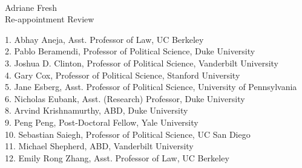 \documentclass[11pt]{article}
\begin{document}
\singlespacing
\setlength{\parindent}{0in}
\setlength{\parskip}{0in}







\noindent \large{\textbf{}} \\ \normalsize
\noindent Adriane Fresh \\
\noindent Re-appointment Review  \\

\vspace*{.2in}

1. Abhay Aneja, Asst. Professor of Law, UC Berkeley\\
2. Pablo Beramendi, Professor of Political Science, Duke University\\
3. Joshua D. Clinton, Professor of Political Science, Vanderbilt University\\
4. Gary Cox, Professor of Political Science, Stanford University\\
5. Jane Esberg, Asst. Professor of Political Science, University of Pennsylvania\\
6. Nicholas Eubank, Asst. (Research) Professor, Duke University\\
8. Arvind Krishnamurthy, ABD, Duke University\\
9. Peng Peng, Post-Doctoral Fellow, Yale University\\
10. Sebastian Saiegh, Professor of Political Science, UC San Diego \\
11. Michael Shepherd, ABD, Vanderbilt University\\
12. Emily Rong Zhang, Asst. Professor of Law, UC Berkeley\\
\end{document}
